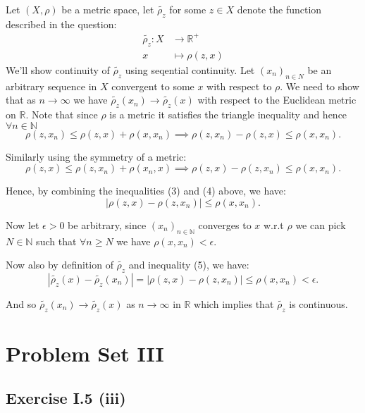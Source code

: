 \documentclass[11pt]{article}
\newcommand\R{\mathbb{R}}
\newcommand\N{\mathbb{N}}
\begin{document}
Let $(X, \rho)$ be a metric space, let $\tilde{\rho_z}$ for some $z \in X$
denote the function described in the question:
\[
\begin{split}
  \tilde{\rho_z}: X & \to \R^+  \\
  x & \mapsto \rho(z, x)
\end{split}
\]
We'll show continuity of $\tilde{\rho_z}$ using seqential continuity. Let
$(x_n)_{n \in N}$ be an arbitrary sequence in $X$ convergent to some $x$ with
respect to $\rho$. We need to show that as $n\to\infty$ we have
$\tilde{\rho_z}(x_n) \to \tilde{\rho_z}(x)$
with respect to the Euclidean metric on $\R$. Note that since $\rho$ is a metric
it satisfies the triangle inequality and hence  $\forall n \in \N$
\begin{equation}
\rho(z, x_n) \leq \rho(z, x) + \rho(x, x_n) \implies \rho(z, x_n) - \rho(z, x) \leq \rho(x, x_n)
.\end{equation}

Similarly using the symmetry of a metric:
\begin{equation}
\rho(z, x) \leq \rho(z, x_n) + \rho(x_n, x) \implies \rho(z, x) - \rho(z, x_n) \leq \rho(x, x_n)
.\end{equation}

Hence, by combining the inequalities (3) and (4) above, we have:
\begin{equation}
|\rho(z, x) - \rho(z, x_n)| \leq \rho(x, x_n)
.\end{equation}

Now let $\epsilon > 0$ be arbitrary, since $(x_n)_{n \in \mathbb{N}}$ converges
to $x$ w.r.t  $\rho$ we can pick  $N\in \N$ such that  $\forall n \geq N$ we have
\(
\rho(x, x_n) < \epsilon
.\)

Now also by definition of $\tilde{\rho_z}$ and inequality (5), we have:
\[
|\tilde{\rho_z}(x) - \tilde{\rho_z}(x_n)| =
|\rho(z, x) - \rho(z, x_n)| \leq \rho(x, x_n) < \epsilon
.\]

And so $\tilde{\rho_z}(x_n) \to \tilde{\rho_z}(x)$ as $n \to \infty$ in $\R$
which implies that $\tilde{\rho_z}$
is continuous. \hfill\blacksquare

\section*{Problem Set III}
\subsection*{Exercise I.5 (iii)}
\end{document}
